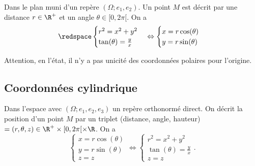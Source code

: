 Dans le plan muni d'un repère $(\Omega; e_1,e_2)$. Un point $M$ est décrit par une distance $r\in \R^+$ et un angle $\theta \in [0,2\pi[$. On a 
	\[\redspace
		\begin{cases}
			r^2 = x^2 + y^2\\
			\tan(\theta) = \frac{y}{x} 
		\end{cases} \Leftrightarrow \begin{cases}
			x = r\cos(\theta)\\
			y = r\sin(\theta)
		\end{cases}
	\]

	\begin{center}

	\end{center}
Attention, en l'état, il n'y a pas unicité des coordonnées polaires pour l'origine.
\sld{\vfill\pagebreak[5]}%
\subsection{Coordonnées cylindrique}


Dans l'espace avec $(\Omega;e_1,e_2,e_3)$ un repère orthonormé direct. On décrit la position d'un point $M$ par un triplet (distance, angle, hauteur)$=(r,\theta,z) \in \R^+ \times [0, 2\pi[ \times \R$. On a
\sld{\vfill\pagebreak[5]}%
\[
	\begin{cases}
		x = r\cos(\theta)\\
		y= r\sin(\theta) \\
		z=z
	\end{cases}
\Leftrightarrow
\begin{cases}
	r^2 = x^2 + y^2\\
	\tan(\theta) = \frac y x \\
	z=z
\end{cases}.
\]

